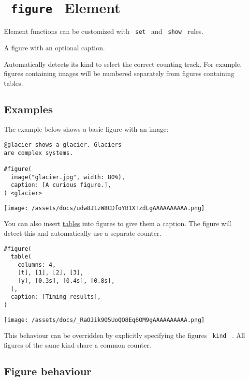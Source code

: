 \section{\texorpdfstring{\texttt{\ figure\ } {{ Element
}}}{ figure   Element }}\label{summary}

\label{element-tooltip}
Element functions can be customized with \texttt{\ set\ } and
\texttt{\ show\ } rules.

A figure with an optional caption.

Automatically detects its kind to select the correct counting track. For
example, figures containing images will be numbered separately from
figures containing tables.

\subsection{Examples}\label{examples}

The example below shows a basic figure with an image:

\begin{verbatim}
@glacier shows a glacier. Glaciers
are complex systems.

#figure(
  image("glacier.jpg", width: 80%),
  caption: [A curious figure.],
) <glacier>
\end{verbatim}

\texttt{[image: /assets/docs/udw8J1zW8CDfoYB1XTzdLgAAAAAAAAAA.png]}

You can also insert \href{/docs/reference/model/table/}{tables} into
figures to give them a caption. The figure will detect this and
automatically use a separate counter.

\begin{verbatim}
#figure(
  table(
    columns: 4,
    [t], [1], [2], [3],
    [y], [0.3s], [0.4s], [0.8s],
  ),
  caption: [Timing results],
)
\end{verbatim}

\texttt{[image: /assets/docs/\_RaOJik9O5UoQO8Eq6OM9gAAAAAAAAAA.png]}

This behaviour can be overridden by explicitly specifying the
figure\textquotesingle s \texttt{\ kind\ } . All figures of the same
kind share a common counter.

\subsection{Figure behaviour}\label{figure-behaviour}

